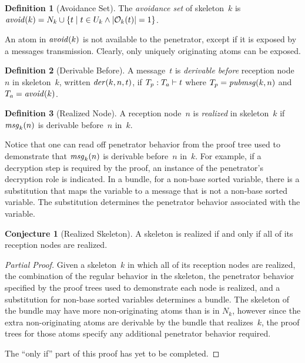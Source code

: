 \documentclass[12pt]{report}
\theoremstyle{definition}
\newtheorem{defn}{Definition}[chapter]
\newtheorem{conj}[thm]{Conjecture}
\newcommand{\pubmsg}{\fn{pubmsg}}
\newcommand{\avoid}{\fn{avoid}}
\newcommand{\msg}{\fn{msg}}
\begin{document}
\begin{defn}[Avoidance Set]\label{def:avoid}
The \emph{avoidance set} of skeleton~$k$ is
$\avoid(k)=N_k\cup\{t\mid t\in U_k\land|\orig_k(t)|=1\}$.
\end{defn}

An atom in $\avoid(k)$ is not available to the penetrator, except
if it is exposed by a messages transmission.  Clearly, only uniquely
originating atoms can be exposed.

\begin{defn}[Derivable Before]\label{def:der}
A message~$t$ is \emph{derivable before}
reception node~$n$ in skeleton~$k$, written $\fn{der}(k,n,t)$, if
$\der{t}{T_p}{T_a}$ where $T_p=\pubmsg(k,n)$ and $T_a=\avoid(k)$.
\end{defn}

\begin{defn}[Realized Node]
A reception node~$n$ is \emph{realized} in skeleton~$k$ if
$\msg_k(n)$ is derivable before~$n$ in~$k$.
\end{defn}

Notice that one can read off penetrator behavior from the proof tree
used to demonstrate that $\msg_k(n)$ is derivable before~$n$
in~$k$.  For example, if a decryption step is required by the proof,
an instance of the penetrator's decryption role is indicated.  In a
bundle, for a non-base sorted variable, there is a substitution that
maps the variable to a message that is not a non-base sorted variable.
The substitution determines the penetrator behavior associated with
the variable.

\begin{conj}[Realized Skeleton]
A skeleton is realized if and only if all of its reception nodes are
realized.
\end{conj}

\begin{proof}[Partial Proof]
Given a skeleton~$k$ in which all of its reception nodes are realized,
the combination of the regular behavior in the skeleton, the
penetrator behavior specified by the proof trees used to demonstrate
each node is realized, and a substitution for non-base sorted
variables determines a bundle.  The skeleton of the bundle may have
more non-originating atoms than is in $N_k$, however since the
extra non-originating atoms are derivable by the bundle that
realizes~$k$, the proof trees for those atoms specify any additional
penetrator behavior required.

The ``only if'' part of this proof has yet to be completed.
\end{proof}
\end{document}
